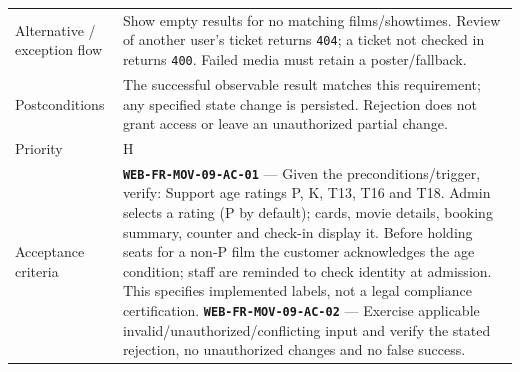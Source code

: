 \begin{longtable}{@{}P{0.23000\SRSWidth}P{0.77000\SRSWidth}@{}}
Alternative /\allowbreak{} exception flow & Show empty results for no matching films/\allowbreak{}showtimes. Review of another user’s ticket returns \texttt{404}; a ticket not checked in returns \texttt{400}. Failed media must retain a poster/\allowbreak{}fallback. \\[3pt]
Postconditions & The successful observable result matches this requirement; any specified state change is persisted. Rejection does not grant access or leave an unauthorized partial change. \\[3pt]
Priority & H \\[3pt]
Acceptance criteria & \textbf{\texttt{WEB-\allowbreak{}FR-\allowbreak{}MOV-\allowbreak{}09-\allowbreak{}AC-\allowbreak{}01}} — Given the preconditions/\allowbreak{}trigger, verify: Support age ratings P, K, T13, T16 and T18. Admin selects a rating (P by default); cards, movie details, booking summary, counter and check-in display it. Before holding seats for a non-P film the customer acknowledges the age condition; staff are reminded to check identity at admission. This specifies implemented labels, not a legal compliance certification. \textbf{\texttt{WEB-\allowbreak{}FR-\allowbreak{}MOV-\allowbreak{}09-\allowbreak{}AC-\allowbreak{}02}} — Exercise applicable invalid/\allowbreak{}unauthorized/\allowbreak{}conflicting input and verify the stated rejection, no unauthorized changes and no false success. \\[3pt]

\end{longtable}
